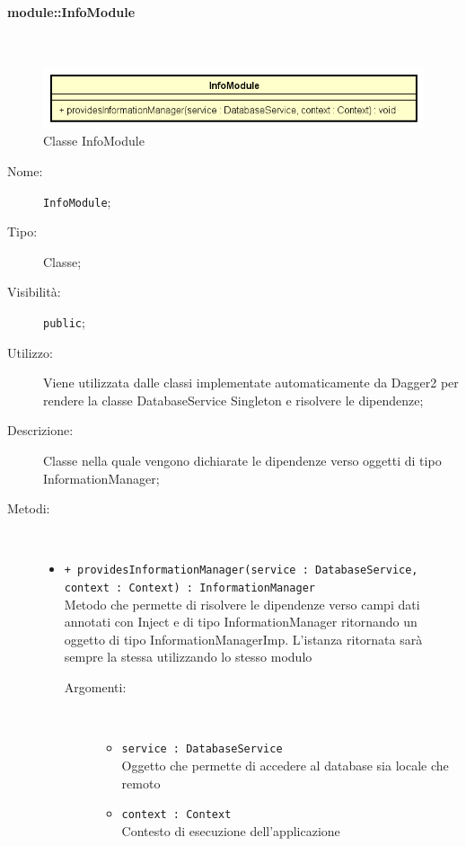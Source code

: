 \documentclass[../DefinizioneDiProdotto.tex]{subfiles}
\begin{document}
\paragraph{module::InfoModule}
\
\begin{figure}[H]
	\centering
	\includegraphics[width=\maxwidth]{img/InfoModule.png}
	\caption{Classe InfoModule}\label{fig:module::InfoModule} 
\end{figure}
\begin{description}
	\item[Nome:] \texttt{InfoModule};
	\item[Tipo:] Classe;
	\item[Visibilità:] \texttt{public};
	\item[Utilizzo:] Viene utilizzata dalle classi implementate automaticamente da Dagger2 per rendere la classe DatabaseService Singleton e risolvere le dipendenze;
	\item[Descrizione:] Classe nella quale vengono dichiarate le dipendenze verso oggetti di tipo InformationManager;
	\item[Metodi:] \
	\begin{itemize}
		\item \texttt{+ providesInformationManager(service : DatabaseService, context : Context) : InformationManager}\\
		Metodo che permette di risolvere le dipendenze verso campi dati annotati con Inject e di tipo InformationManager ritornando un oggetto di tipo InformationManagerImp. L'istanza ritornata sarà sempre la stessa utilizzando lo stesso modulo
		\begin{description}
			\item[Argomenti:] \
			\begin{itemize}
				\item \texttt{service : DatabaseService}\\
				Oggetto che permette di accedere al database sia locale che remoto\item \texttt{context : Context}\\
				Contesto di esecuzione dell'applicazione\end{itemize}
		\end{description}
	\end{itemize}
\end{description}
\end{document}
